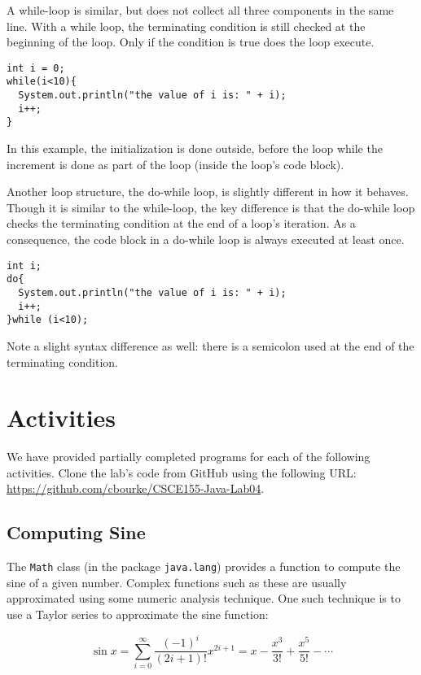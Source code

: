 \documentclass[12pt]{scrartcl}
\begin{document}
A while-loop is similar, but does not collect all three components 
in the same line.  With a while loop, the terminating condition is 
still checked at the beginning of the loop.  Only if the condition is 
true does the loop execute.  

\begin{verbatim}
int i = 0;
while(i<10){
  System.out.println("the value of i is: " + i);
  i++;
}
\end{verbatim}

In this example, the initialization is done outside, before the loop 
while the increment is done as part of the loop (inside the loop's 
code block).  

Another loop structure, the do-while loop, is slightly different in 
how it behaves.  Though it is similar to the while-loop, the key 
difference is that the do-while loop checks the terminating condition 
at the end of a loop's iteration.  As a consequence, the code block 
in a do-while loop is always executed at least once.

\begin{verbatim}
int i;
do{
  System.out.println("the value of i is: " + i);
  i++;
}while (i<10);
\end{verbatim}

Note a slight syntax difference as well: there is a semicolon used 
at the end of the terminating condition. 

\section{Activities}

We have provided partially completed programs for each of the 
following activities.  Clone the lab's code from GitHub using the 
following URL: \url{https://github.com/cbourke/CSCE155-Java-Lab04}.

\subsection{Computing Sine}

The \texttt{Math} class (in the package \texttt{java.lang})
provides a function to compute the sine 
of a given number.  Complex functions such as these are usually 
approximated using some numeric analysis technique.  One such 
technique is to use a Taylor series to approximate the sine function:

$$\sin{x} = \sum_{i=0}^\infty \frac{(-1)^i}{(2i+1)!} x^{2i+1} = x - \frac{x^3}{3!}+\frac{x^5}{5!}-\cdots$$
\end{document}
